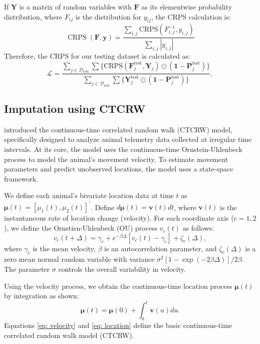 \documentclass[11pt]{article}
\begin{document}
If $\bm{Y}$ is a matrix of random variables with $\bm{F}$ as its elementwise probability distribution, where $F_{ij}$ is the distribution for $y_{ij}$, the CRPS calculation is: \begin{equation}
    \operatorname{CRPS}\left(\bm{F}, \bm{y}\right) = \frac{\sum_{i,j}\mathrm{CRPS}(F^{-1}_{i,j},y_{i,j})}{\sum_{i,j}|y_{i,j}|}
\end{equation}
Therefore, the CRPS for our testing dataset is calculated as: \begin{equation}
    \mathcal{L}=\frac{\sum_{j\in \mathcal{D}_{\mathrm{test}}}\sum \big\{\mathrm{CRPS}(\bm{F}^{\mathrm{test}}_j,\bm{Y}_j)\odot (\bm{1}-\bm{P}_j^{\mathrm{test}})\big\}}{\sum_{j\in \mathcal{D}_{\mathrm{test}}}\sum\{\bm{Y}_j^{\mathrm{test}}\odot (\bm{1}-\bm{P}_j^{\mathrm{test}})\}},
\end{equation}



\subsection{Imputation using CTCRW}\label{sec: imputation using ctcrw}

\citet{johnson2008continuous} introduced the continuous-time correlated random walk (CTCRW) model, specifically designed to analyze animal telemetry data collected at irregular time intervals. At its core, the model uses the continuous-time Ornstein-Uhlenbeck process to model the animal's movement velocity. To estimate movement parameters and predict unobserved locations, the model uses a state-space framework. 

We define each animal's bivariate location data at time $t$ as $\bm{\mu}(t)=[\mu_1(t), \mu_2(t)]^{\prime}$. Define $d\bm{\mu}(t)=\bm{v}(t)dt$, where $\bm{v}(t)$ is the instantaneous rate of location change (velocity). For each coordinate axis ($c=1, 2$), we define the Ornstien-Uhlenbeck (OU) process $v_c(t)$ as follows:
\begin{equation}\label{eq: velocity}
    v_c(t+\Delta)=\gamma_c+e^{-\beta\Delta}[v_c(t)-\gamma_c]+\zeta_c(\Delta),
\end{equation}
where $\gamma_c$ is the mean velocity, $\beta$ is an autocorrelation parameter, and $\zeta_c(\Delta)$ is a zero mean normal random variable with variance $\sigma^2[1-\exp(-2\beta\Delta)]/2\beta$. The parameter $\sigma$ controls the overall variability in velocity.

Using the velocity process, we obtain the continuous-time location process $\bm{\mu}(t)$ by integration as shown:
\begin{equation}\label{eq: location}
    \bm{\mu}(t)=\bm{\mu}(0)+\int_{0}^{t}\bm{v}(u)du.
\end{equation}
Equations \ref{eq: velocity} and \ref{eq: location} define the basic continuous-time correlated random walk model (CTCRW).
\end{document}
